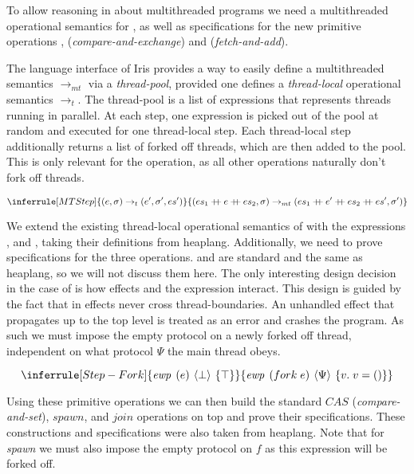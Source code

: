 To allow reasoning in \hazel{} about multithreaded programs we need a multithreaded operational semantics for \hh{}, as well as specifications for the new primitive operations \xfork{}, \xcmp{} (\emph{compare-and-exchange}) and \xfaa{} (\emph{fetch-and-add}).

The language interface of Iris provides a way to easily define a multithreaded semantics $\to_{mt}$ via a \emph{thread-pool}, 
provided one defines a \emph{thread-local} operational semantics $\to_t$.
The thread-pool is a list of expressions that represents threads running in parallel.
At each step, one expression is picked out of the pool at random and executed for one thread-local step.
Each thread-local step additionally returns a list of forked off threads, which are then added to the pool.
This is only relevant for the \xfork{} operation, as all other operations naturally don't fork off threads.

\[
\inferrule[MTStep]
{(e, \sigma) \to_{t} (e', \sigma', es')}
{(es_1 \mdpp e \mdpp es_2, \sigma) \to_{mt} (es_1 \mdpp e' \mdpp es_2 \mdpp es', \sigma')}
\]

We extend the existing thread-local operational semantics of \hh{} with the expressions \xfork{}, \xcmp{} and \xfaa{}, taking their definitions from heaplang.
Additionally, we need to prove specifications for the three operations.
\xcmp{} and \xfaa{} are standard and the same as heaplang, so we will not discuss them here.
The only interesting design decision in the case of \hh{} is how effects and the \xfork{} expression interact.
This design is guided by the fact that in \ocf{} effects never cross thread-boundaries.
An unhandled effect that propagates up to the top level is treated as an error and crashes the program.
As such we must impose the empty protocol on a newly forked off thread, independent on what protocol \(\Psi\) the main thread obeys.

\[
\inferrule[Step-Fork]
{\ewp{e}{\bot}{\top}}
{\ewp{fork\; e}{\Psi}{v.\; v = ()}}
\]

Using these primitive operations we can then build the standard $\mathit{CAS}$ (\emph{compare-and-set}), $spawn$, and $join$ operations on top and prove their specifications.
These constructions and specifications were also taken from heaplang.
Note that for \emph{spawn} we must also impose the empty protocol on $f$ as this expression will be forked off.



